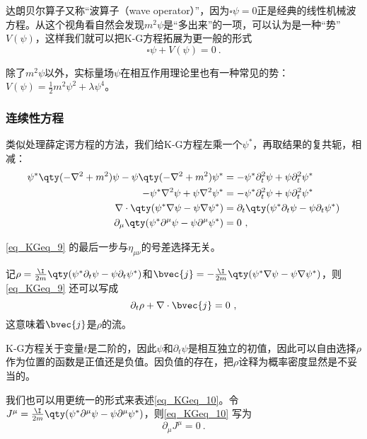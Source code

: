 达朗贝尔算子又称“波算子（wave operator）”，因为$\square \psi=0$正是经典的线性机械波方程。从这个视角看自然会发现$m^2\psi$是“多出来”的一项，可以认为是一种“势”$V(\psi)$，这样我们就可以把K-G方程拓展为更一般的形式
\begin{equation}
\square\psi + V(\psi) = 0~.
\end{equation}

除了$m^2\psi$以外，实标量场$\psi$在相互作用理论里也有一种常见的势：$V(\psi)=\frac{1}{2}m^2\psi^2+\lambda\psi^4$。





\subsubsection{连续性方程}

类似处理薛定谔方程的方法，我们给K-G方程左乘一个$\psi^*$，再取结果的复共轭，相减：
\begin{equation}\label{eq_KGeq_9}
\begin{aligned}
\psi^*\qty(-\nabla^2+m^2)\psi-\psi\qty(-\nabla^2+m^2)\psi^* &= -\psi^*\partial_t^2 \psi+\psi\partial_t^2 \psi^*\\
-\psi^*\nabla^2\psi+\psi\nabla^2\psi^* &= -\psi^*\partial_t^2\psi+\psi\partial_t^2\psi^*\\
\nabla\cdot\qty(\psi^*\nabla\psi-\psi\nabla\psi^*) &= \partial_t\qty(\psi^*\partial_t\psi-\psi\partial_t\psi^*)\\
\partial_\mu\qty(\psi^*\partial^\mu\psi-\psi\partial^\mu\psi^*) & =0~,
\end{aligned}
\end{equation}

\autoref{eq_KGeq_9} 的最后一步与$\eta_{\mu\nu}$的号差选择无关。

记$\rho=\frac{\I}{2m}\qty(\psi^*\partial_t\psi-\psi\partial_t\psi^*)$和$\bvec{j}=-\frac{\I}{2m}\qty(\psi^*\nabla\psi-\psi\nabla\psi^*)$，则\autoref{eq_KGeq_9} 还可以写成
\begin{equation}\label{eq_KGeq_10}
\partial_t\rho+\nabla\cdot\bvec{j} = 0~,
\end{equation}
这意味着$\bvec{j}$是$\rho$的流。

K-G方程关于变量$t$是二阶的，因此$\psi$和$\partial_t\psi$是相互独立的初值，因此可以自由选择$\rho$作为位置的函数是正值还是负值。因负值的存在，把$\rho$诠释为概率密度显然是不妥当的。

我们也可以用更统一的形式来表述\autoref{eq_KGeq_10}。令$J^\mu=\frac{\I}{2m}\qty(\psi^*\partial^\mu\psi-\psi\partial^\mu\psi^*)$，则\autoref{eq_KGeq_10} 写为
\begin{equation}
\partial_\mu J^\mu = 0~.
\end{equation}



